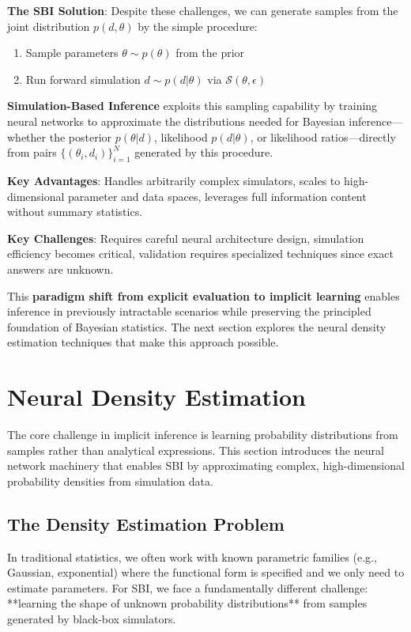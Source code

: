 \documentclass[11pt,a4paper]{article}
\theoremstyle{definition}
\begin{document}
\textbf{The SBI Solution}: Despite these challenges, we can generate samples from the joint distribution $p(d, \theta)$ by the simple procedure:
\begin{enumerate}
    \item Sample parameters $\theta \sim p(\theta)$ from the prior
    \item Run forward simulation $d \sim p(d|\theta)$ via $\mathcal{S}(\theta, \epsilon)$
\end{enumerate}

\textbf{Simulation-Based Inference} exploits this sampling capability by training neural networks to approximate the distributions needed for Bayesian inference—whether the posterior $p(\theta|d)$, likelihood $p(d|\theta)$, or likelihood ratios—directly from pairs $\{(\theta_i, d_i)\}_{i=1}^N$ generated by this procedure.

\textbf{Key Advantages}: Handles arbitrarily complex simulators, scales to high-dimensional parameter and data spaces, leverages full information content without summary statistics.

\textbf{Key Challenges}: Requires careful neural architecture design, simulation efficiency becomes critical, validation requires specialized techniques since exact answers are unknown.

This \textbf{paradigm shift from explicit evaluation to implicit learning} enables inference in previously intractable scenarios while preserving the principled foundation of Bayesian statistics. The next section explores the neural density estimation techniques that make this approach possible.

\section{Neural Density Estimation}

The core challenge in implicit inference is learning probability distributions from samples rather than analytical expressions. This section introduces the neural network machinery that enables SBI by approximating complex, high-dimensional probability densities from simulation data.

\subsection{The Density Estimation Problem}

In traditional statistics, we often work with known parametric families (e.g., Gaussian, exponential) where the functional form is specified and we only need to estimate parameters. For SBI, we face a fundamentally different challenge: **learning the shape of unknown probability distributions** from samples generated by black-box simulators.
\end{document}
